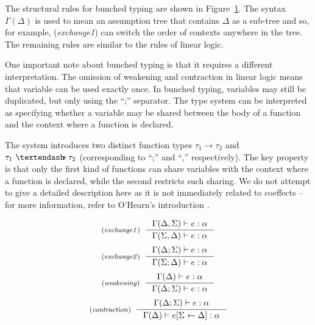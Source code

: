 The structural rules for bunched typing are shown in Figure~\ref{fig:substructural-bunched}.
The syntax $\Gamma(\Delta)$ is used to mean an assumption tree that contains $\Delta$ as a 
sub-tree and so, for example, (\emph{exchange1}) can switch the order of contexts anywhere in the
tree. The remaining rules are similar to the rules of linear logic.

One important note about bunched typing is that it requires a different interpretation. The omission
of weakening and contraction in linear logic means that variable can be used exactly once. 
In bunched typing, variables may still be duplicated, but only using the ``;'' separator.
The type system can be interpreted as specifying whether a variable may be shared between the 
body of a function and the context where a function is declared. 

The system introduces two 
distinct function types $\tau_1 \rightarrow \tau_2$ and $\tau_1~ \textendash\!\!\!\ast \tau_2$
(corresponding to ``;'' and ``,'' respectively). The key property is that only the first kind
of functions can share variables with the context where a function is declared, while the second
restricts such sharing. We do not attempt to give a detailed description here as it is not 
immediately related to coeffects -- for more information, refer to O'Hearn's introduction 
\cite{substruct-bunched}.

\begin{figure}
\begin{equation*}
\tyrule{exchange1}
  {\Gamma(\Delta, \Sigma) \vdash e : \alpha}
  {\Gamma(\Sigma, \Delta) \vdash e : \alpha}
\end{equation*}
\begin{equation*}
\tyrule{exchange2}
  {\Gamma(\Delta; \Sigma) \vdash e : \alpha}
  {\Gamma(\Sigma; \Delta) \vdash e : \alpha}
\end{equation*}
\begin{equation*}
\tyrule{weakening}
  {\Gamma(\Delta) \vdash e : \alpha}
  {\Gamma(\Delta; \Sigma) \vdash e : \alpha}
\end{equation*}
\begin{equation*}
\tyrule{contraction}
  {\Gamma(\Delta; \Sigma) \vdash e : \alpha}
  {\Gamma(\Delta) \vdash \subst{e}{\Sigma}{\Delta} : \alpha}
\end{equation*}
\label{fig:substructural-bunched}
\end{figure}


